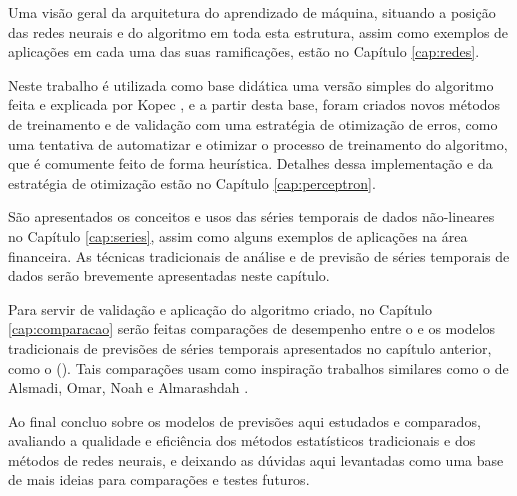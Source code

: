 Uma visão geral da arquitetura do aprendizado de máquina, situando a posição das redes neurais e do algoritmo  em toda esta estrutura, assim como exemplos de aplicações em cada uma das suas ramificações, estão no Capítulo \ref{cap:redes}.

Neste trabalho é utilizada como base didática uma versão simples do algoritmo  feita e explicada por Kopec \citep{classic}, e a partir desta base, foram criados novos métodos de treinamento e de validação com uma estratégia de otimização de erros, como uma tentativa de automatizar e otimizar o processo de treinamento do algoritmo, que é comumente feito de forma heurística. Detalhes dessa implementação e da estratégia de otimização estão no Capítulo \ref{cap:perceptron}.

São apresentados os conceitos e usos das séries temporais de dados não-lineares no Capítulo \ref{cap:series}, assim como alguns exemplos de aplicações na área financeira. As técnicas tradicionais de análise e de previsão de séries temporais de dados serão brevemente apresentadas neste capítulo.

Para servir de validação e aplicação do algoritmo criado, no Capítulo \ref{cap:comparacao} serão feitas comparações de desempenho entre o  e os modelos tradicionais de previsões de séries temporais apresentados no capítulo anterior, como o  (). Tais comparações usam como inspiração trabalhos similares como o de Alsmadi, Omar, Noah e Almarashdah \citep{4809024}.

Ao final concluo sobre os modelos de previsões aqui estudados e comparados, avaliando a qualidade e eficiência dos métodos estatísticos tradicionais e dos métodos de redes neurais, e deixando as dúvidas aqui levantadas como uma base de mais ideias para comparações e testes futuros.

